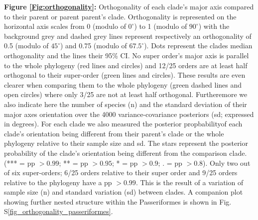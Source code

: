 \documentclass[12pt,letterpaper]{article}
\begin{document}
\noindent \textbf{Figure \ref{Fig:orthogonality}:}
Orthogonality of each clade's major axis compared to their parent or parent parent's clade.
Orthogonality is represented on the horizontal axis scales from 0 (modulo of $0^\circ$) to 1 (modulo of $90^\circ$) with the background grey and dashed grey lines represent respectively an orthogonality of 0.5 (modulo of $45^\circ$) and 0.75 (modulo of $67.5^\circ$).
Dots represent the clades median orthogonality and the lines their 95\% CI.
No super order's major axis is parallel to the whole phylogeny (red lines and circles) and 12/25 orders are at least half orthogonal to their super-order (green lines and circles).
These results are even clearer when comparing them to the whole phylogeny (green dashed lines and open circles) where only 3/25 are not at least half orthogonal.
Furtheremore we also indicate here the number of species (n) and the standard deviation of their major axes orientation over the 4000 variance-covariance posteriors (sd; expressed in degrees).
For each clade we also measured the posterior propbabilityof each clade's orientation being different from their parent's clade or the whole phylogeny relative to their sample size and sd.
The stars represent the posterior probability of the clade's orientation being different from the comparison clade. (*** = pp $> 0.99$; ** = pp $>0.95$; * = pp $> 0.9$; . = pp $> 0.8$).
Only two out of six super-orders; 6/25 orders relative to their super order and 9/25 orders relative to the phylogeny have a pp $> 0.99$.
This is the result of a variation of sample size (n) and standard variation (sd) between clades. 
A companion plot showing further nested structure within the Passeriformes is shown in Fig. S\ref{fig_orthogonality_passeriformes}.







\end{document}
